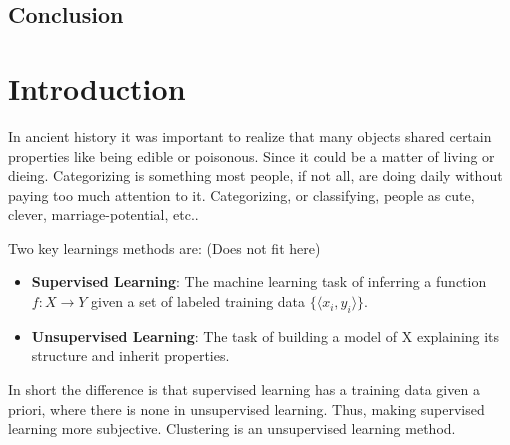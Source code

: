 \documentclass[a4paper,10pt]{article}
\theoremstyle{plain}
\theoremstyle{definition}
\begin{document}
\subsection{Conclusion}

\newpage
\section{Introduction}

In ancient history it was important to realize that many objects shared certain properties like being edible or poisonous. Since it could be a matter of living or dieing. Categorizing is something most people, if not all, are doing daily without paying too much attention to it. Categorizing, or classifying, people as cute, clever, marriage-potential, etc..

Two key learnings methods are: (Does not fit here)
\begin{itemize}
	\item \textbf{Supervised Learning}: The machine learning task of inferring a function $f : X \rightarrow Y$ given a set of labeled training data $\{ \langle x_i, y_i \rangle \}$. 
	\item \textbf{Unsupervised Learning}: The task of building a model of X explaining its structure and inherit properties.
\end{itemize}
In short the difference is that supervised learning has a training data given a priori, where there is none in unsupervised learning. Thus, making supervised learning more subjective. Clustering is an unsupervised learning method.


\end{document}
